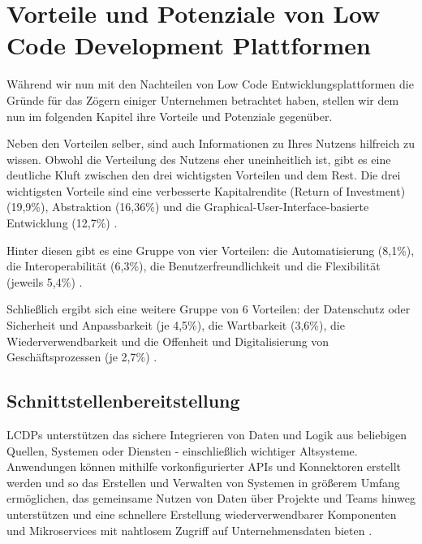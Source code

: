 \documentclass[12pt]{article} %
\begin{document}
	\section{Vorteile  und Potenziale von Low Code Development Plattformen}
	Während wir nun mit den Nachteilen von Low Code Entwicklungsplattformen die Gründe für das Zögern einiger Unternehmen betrachtet haben, stellen wir dem nun im folgenden Kapitel ihre Vorteile und Potenziale gegenüber.
	
	Neben den Vorteilen selber, sind auch Informationen zu Ihres Nutzens hilfreich zu wissen. Obwohl die Verteilung des Nutzens eher uneinheitlich ist, gibt es eine deutliche Kluft zwischen den drei wichtigsten Vorteilen und dem Rest. Die drei wichtigsten Vorteile sind eine verbesserte Kapitalrendite (Return of Investment) (19,9\%), Abstraktion (16,36\%) und die Graphical-User-Interface-basierte Entwicklung (12,7\%) \autocite{Bucaioni.2022}. 
	
	Hinter diesen gibt es eine Gruppe von vier Vorteilen: die Automatisierung (8,1\%), die Interoperabilität (6,3\%), die Benutzerfreundlichkeit und die Flexibilität (jeweils 5,4\%) \autocite{Bucaioni.2022}.
	
	Schließlich ergibt sich eine weitere Gruppe von 6 Vorteilen: der Datenschutz oder Sicherheit und Anpassbarkeit (je 4,5\%), die Wartbarkeit (3,6\%), die Wiederverwendbarkeit und die Offenheit und Digitalisierung von Geschäftsprozessen (je 2,7\%) \autocite{Bucaioni.2022}.
	
	\subsection{Schnittstellenbereitstellung} 
	LCDPs unterstützen das sichere Integrieren von Daten und Logik aus beliebigen Quellen, Systemen oder Diensten - einschließlich wichtiger Altsysteme. Anwendungen können mithilfe vorkonfigurierter APIs und Konnektoren erstellt werden und so das Erstellen und Verwalten von Systemen in größerem Umfang ermöglichen, das gemeinsame Nutzen von Daten über Projekte und Teams hinweg unterstützen und eine schnellere Erstellung wiederverwendbarer Komponenten und Mikroservices mit nahtlosem Zugriff auf Unternehmensdaten bieten \autocite{Mendix.2023}.
	
\end{document}
